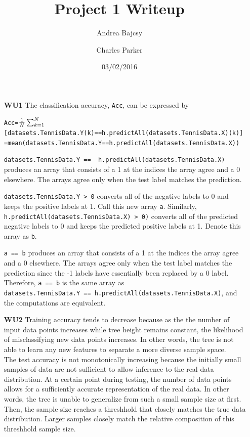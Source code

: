 \documentclass{article}
\title{Project 1 Writeup}
\date{03/02/2016}
\author{Andrea Bajcsy \and Charles Parker}
\begin{document}
	\maketitle
	
	\begin{enumerate}
	
	\item[\textbf{WU1}] The classification accuracy, \verb|Acc|, can be expressed by
	
		\begin{alltt}
			Acc = \(\frac{1}{N} \sum\sb{k=1}\sp{N} \) [ datasets.TennisData.Y(k) == h.predictAll(datasets.TennisData.X)(k) ] \\
			\quad  = mean (datasets.TennisData.Y == h.predictAll(datasets.TennisData.X)) 
		\end{alltt}
	
		\verb|datasets.TennisData.Y ==  h.predictAll(datasets.TennisData.X)| produces an array
		that consists of a 1 at the indices the array agree and a 0 elsewhere. The arrays agree
		only when the test label matches the prediction.
	
		\verb|datasets.TennisData.Y > 0| converts all of the negative labels to 0 and keeps the 
		positive labels at 1. Call this new array \verb|a|. Similarly, 
		\verb|h.predictAll(datasets.TennisData.X) > 0)| converts all of the predicted negative
		labels to 0 and keeps the predicted positive labels at 1. Denote this array as \verb|b|.

		\verb|a == b| produces an array that consists of a 1 at the indices the array agree and 
		a 0 elsewhere. The arrays agree only when the test label matches the prediction since the
		-1 labels have essentially been replaced by a 0 label. Therefore, \verb|a == b| is the same
		array as \\
		\verb|datasets.TennisData.Y == h.predictAll(datasets.TennisData.X)|, 
		and the computations are equivalent.
		
	\item[\textbf{WU2}] Training accuracy tends to decrease because as the the number of
		input data points increases while tree height remains constant, the likelihood of
		misclassifying new data points increases. In other words, the tree is not able to learn
		any new features to separate a more diverse sample space. \\
		
		The test accuracy is not monotonically increasing because the initially small samples of
		data are not sufficient to allow inference to the real data distribution. At a certain
		point during testing, the number of data points allows for a sufficiently accurate
		representation of the real data. In other words, the tree is unable to generalize
		from such a small sample size at first. Then, the sample size reaches a threshhold
		that closely matches the true data distribution. Larger samples closely match the relative
		composition of this threshhold sample size. \\
		

\end{enumerate}
\end{document}

